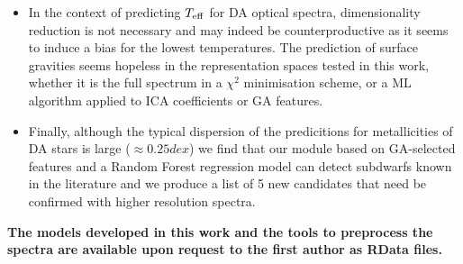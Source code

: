 \begin{itemize}
\item In the context of predicting $T_{\rm eff}$ for DA optical spectra, 
      dimensionality reduction is not necessary and may indeed be counterproductive 
      as it seems to induce a bias for the lowest temperatures. 
      The prediction of surface gravities seems hopeless in the representation 
      spaces tested in this work, whether it is the full spectrum 
      in a $\chi^2$ minimisation scheme, or a ML algorithm 
      applied to ICA coefficients or GA features.

\item Finally, although the typical dispersion of the predicitions for 
      metallicities of DA stars is large ($\approx 0.25 dex$) we find 
      that our module based on GA-selected features and a Random Forest 
      regression model can detect subdwarfs known in the literature and we 
      produce a list of 5 new candidates that need be confirmed with 
      higher resolution spectra.  

\end{itemize}


{\bf The models developed in this work and the tools to preprocess the
  spectra are available upon request to the first author as RData
  files.}
